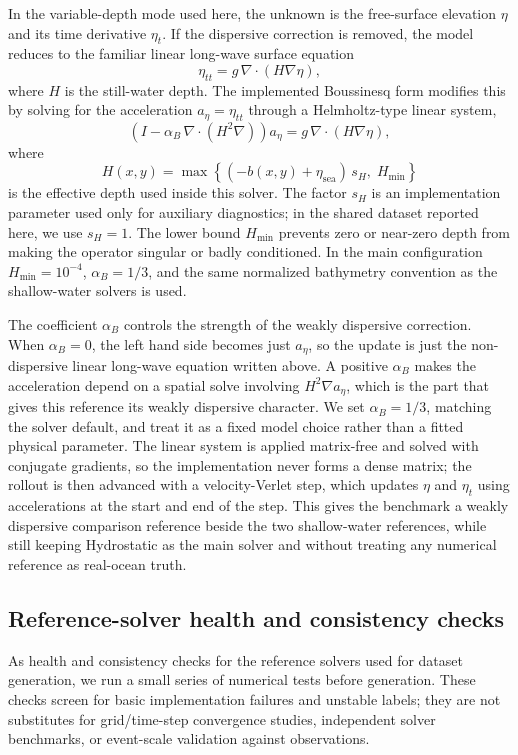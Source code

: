 In the variable-depth mode used here, the unknown is the free-surface elevation $\eta$ and its time derivative $\eta_t$. If the dispersive correction is removed, the model reduces to the familiar linear long-wave surface equation
\[
\eta_{tt} = g\, \nabla \cdot(H \nabla \eta),
\]
where $H$ is the still-water depth. The implemented Boussinesq form modifies this by solving for the acceleration $a_\eta = \eta_{tt}$ through a Helmholtz-type linear system,
\[
\left(I - \alpha_B\, \nabla \cdot(H ^ 2 \nabla)\right) a_\eta = g\, \nabla \cdot(H \nabla \eta),
\]
where
\[
H(x, y) = \max\!\left\{(-b(x, y) + \eta_{\mathrm{sea}})\, s_H,\; H_{\min}\right\}
\]
is the effective depth used inside this solver. The factor $s_H$ is an implementation parameter used only for auxiliary diagnostics; in the shared dataset reported here, we use $s_H = 1$. The lower bound $H_{\min}$ prevents zero or near-zero depth from making the operator singular or badly conditioned. In the main configuration $H_{\min} = 10^{-4}$, $\alpha_B = 1/3$, and the same normalized bathymetry convention as the shallow-water solvers is used.

The coefficient $\alpha_B$ controls the strength of the weakly dispersive correction. When $\alpha_B = 0$, the left hand side becomes just $a_\eta$, so the update is just the non-dispersive linear long-wave equation written above. A positive $\alpha_B$ makes the acceleration depend on a spatial solve involving $H ^ 2 \nabla a_\eta$, which is the part that gives this reference its weakly dispersive character. We set $\alpha_B = 1/3$, matching the solver default, and treat it as a fixed model choice rather than a fitted physical parameter. The linear system is applied matrix-free and solved with conjugate gradients, so the implementation never forms a dense matrix; the rollout is then advanced with a velocity-Verlet step, which updates $\eta$ and $\eta_t$ using accelerations at the start and end of the step. This gives the benchmark a weakly dispersive comparison reference beside the two shallow-water references, while still keeping Hydrostatic as the main solver and without treating any numerical reference as real-ocean truth.

\subsection{Reference-solver health and consistency checks}
\label{subsec:reference-validation}

As health and consistency checks for the reference solvers used for dataset generation, we run a small series of numerical tests before generation. These checks screen for basic implementation failures and unstable labels; they are not substitutes for grid/time-step convergence studies, independent solver benchmarks, or event-scale validation against observations.

